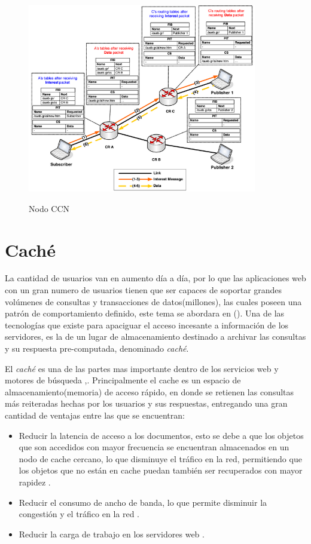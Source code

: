 \documentclass[12pt]{ociamthesis}  %
\begin{document}
	\begin{figure}[!htb]
		\centering
		\includegraphics[width=10cm]{Nodo2.png}\\
		\caption{Nodo CCN}
		\label{fig:mesh1}
	\end{figure}


\section{Caché}
La cantidad de usuarios van en aumento día a día, por lo que las aplicaciones web con un gran numero de usuarios tienen que ser capaces de soportar grandes volúmenes de consultas y transacciones de datos(millones), las cuales poseen una patrón de comportamiento definido, este tema se abordara en (). Una de las tecnologías que existe para apaciguar el acceso incesante a información de los servidores, es la de un lugar de almacenamiento destinado a archivar las consultas y su respuesta pre-computada, denominado \textit{caché}.

El \textit{caché} es una de las partes mas importante dentro de los servicios web y motores de búsqueda \cite{altingovde2009cost},\cite{aggarwal1999caching}. Principalmente el cache es un espacio de almacenamiento(memoria) de acceso rápido, en donde se retienen las consultas más reiteradas hechas por los usuarios y sus respuestas, entregando una gran cantidad de ventajas entre las que se encuentran:

\begin{itemize}
	
	\item Reducir la latencia de acceso a los documentos, esto se debe a que los objetos que son accedidos con mayor frecuencia se encuentran almacenados en un nodo de cache cercano, lo que disminuye el tráfico en la red, permitiendo que los objetos que no están en cache puedan también ser recuperados con mayor rapidez \cite{wang1999survey}.
	
	\item Reducir el consumo de ancho de banda, lo que permite disminuir la congestión y el tráfico en la red \cite{wang1999survey}.
	
	\item Reducir la carga de trabajo en los servidores web \cite{wang1999survey}.
	
\end{itemize}
\end{document}
